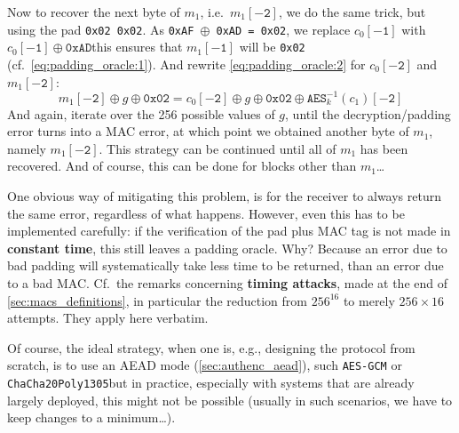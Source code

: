   Now to recover the next byte of $m_1$, i.e.\ $m_1\mathtt{[-2]}$, we do the same trick, but using the pad \texttt{0x02 0x02}. As \texttt{0xAF $\oplus$ 0xAD = 0x02}, we replace $c_0\mathtt{[-1]}$ with $c_0\mathtt{[-1]} \oplus \mathtt{0xAD}$\emd this ensures that $m_1\mathtt{[-1]}$ will be \texttt{0x02} (cf.\ \eqref{eq:padding_oracle:1}). And rewrite \eqref{eq:padding_oracle:2} for $c_0\mathtt{[-2]}$ and $m_1\mathtt{[-2]}$:
  \begin{equation}
    \label{eq:padding_oracle:5}
    m_1\mathtt{[-2]} \oplus g \oplus \texttt{0x02} = c_0\mathtt{[-2]} \oplus g \oplus \texttt{0x02} \oplus \texttt{AES}_k^{-1}(c_1)\mathtt{[-2]}
  \end{equation}
  And again, iterate over the 256 possible values of $g$, until the decryption/padding error turns into a MAC error, at which point we obtained another byte of $m_1$, namely $m_1\mathtt{[-2]}$. This strategy can be continued until all of $m_1$ has been recovered. And of course, this can be done for blocks other than $m_1$\dots

  \bigskip

   One obvious way of mitigating this problem, is for the receiver to always return the same error, regardless of what happens. However, even this has to be implemented carefully: if the verification of the pad plus MAC tag is not made in \textbf{constant time}, this still leaves a padding oracle. Why? Because an error due to bad padding will systematically take less time to be returned, than an error due to a bad MAC. Cf.\ the remarks concerning \textbf{timing attacks}, made at the end of \ts\ref{sec:macs_definitions}, in particular the reduction from $256^{16}$ to merely $256\times 16$ attempts. They apply here verbatim.

  Of course, the ideal strategy, when one is, e.g., designing the protocol from scratch, is to use an AEAD mode (\ts\ref{sec:authenc_aead}), such \texttt{AES-GCM} or \texttt{ChaCha20Poly1305}\emd but in practice, especially with systems that are already largely deployed, this might not be possible (usually in such scenarios, we have to keep changes to a minimum\dots).


